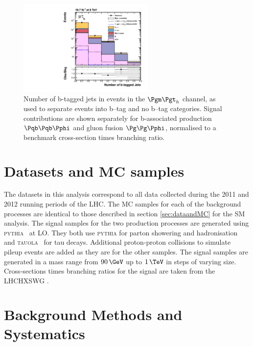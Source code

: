 \begin{figure}[tbh]
\includegraphics[width=0.6\textwidth]{plots/htt-mssm/n_bjets_inclusive_mt_2012_log.pdf}

\caption[Number of b-tagged jets in events in the $\mutau$ channel, as used to separate
events into b--tag and no b--tag categories.]{Number of b-tagged jets in events
in the $\mutau$ channel, as used to separate
events into b--tag and no b--tag categories. Signal contributions are shown
separately for b-associated production $\Pqb\Pqb\Pphi$ and gluon fusion
$\Pg\Pg\Pphi$, normalised to a benchmark cross-section times branching ratio.}
\label{fig:nbtag}
\end{figure}

\section{Datasets and \ac{MC} samples}
\label{sec:mssmdataandMC}

The datasets in this analysis correspond to all data collected during the 2011
and 2012 running periods of the \ac{LHC}.
The \ac{MC} samples for each of the background processes are
identical to those described in section \ref{sec:dataandMC} for the \ac{SM}
analysis. The signal samples for the two production processes are
generated using \textsc{pythia}~\cite{Sjostrand:2006za} at \ac{LO}. They both use \textsc{pythia}
for parton showering and hadronisation and \textsc{tauola}~\cite{TAUOLA} for tau
decays. Additional proton-proton collisions to simulate pileup events are added
as they are for the other samples. The signal samples are generated in a mass range from
$90\,\GeV$ up to $1\,\TeV$ in steps of varying size. Cross-sections times
branching ratios for the signal are taken from the \ac{LHCHXSWG}
\cite{LHCHiggsCrossSectionWorkingGroup:2011ti,Dittmaier:2012vm,Heinemeyer:2013tqa}.

\section{Background Methods and Systematics}
\label{sec:mssmBackgroundsSysts}

